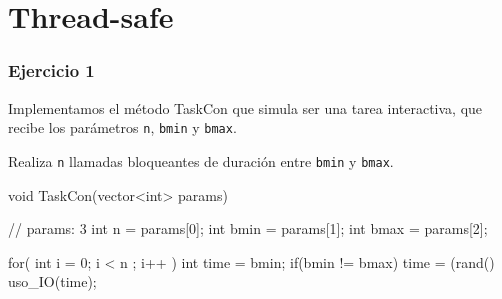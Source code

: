 \part{Thread-safe}

\section{Ejercicio 1}

Implementamos el m\'etodo TaskCon que simula ser una tarea interactiva, que recibe los par\'ametros \verb|n|, \verb|bmin| y \verb|bmax|.

Realiza \verb|n| llamadas bloqueantes de duraci\'on entre \verb|bmin| y \verb|bmax|.

\begin{framed}
\begin{verbatimtab}
void TaskCon(vector<int> params) { // params: 3
	int n = params[0];
	int bmin = params[1];
	int bmax = params[2];
	
	for( int i = 0; i < n ; i++ ) {
		int time = bmin;
		if(bmin != bmax)
			time = (rand()%
		uso_IO(time);
	}
}
\end{verbatimtab}
\end{framed}
